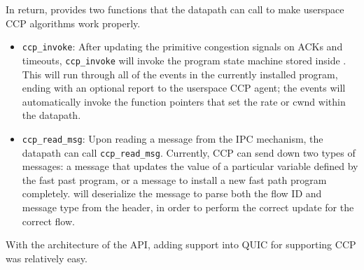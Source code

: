 In return, \libccp provides two functions that the datapath can call to make userspace CCP algorithms work properly.
\begin{itemize}
    \item \texttt{ccp\_invoke}: After updating the primitive congestion signals on ACKs and timeouts, \texttt{ccp\_invoke} will invoke the program state machine stored inside \libccp. This will run through all of the events in the currently installed program, ending with an optional report to the userspace CCP agent; the events will automatically invoke the function pointers that set the rate or cwnd within the datapath.
    \item \texttt{ccp\_read\_msg}: Upon reading a message from the IPC mechanism, the datapath can call \texttt{ccp\_read\_msg}. 
        Currently, CCP can send down two types of messages: a message that updates the value of a particular variable defined by the fast past program, or a message to install a new fast path program completely. 
        \libccp will deserialize the message to parse both the flow ID and message type from the header, in order to perform the correct update for the correct flow.
\end{itemize}

With the architecture of the \libccp API, adding support into QUIC for supporting CCP was relatively easy.

